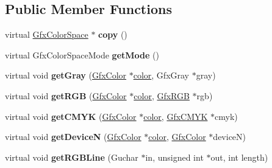 \subsection*{Public Member Functions}
\begin{DoxyCompactItemize}
\item 
\mbox{\label{class_gfx_device_c_m_y_k_color_space_ae210b4f2d41c9d1d6f9f5a31eabe4493}} 
virtual \hyperlink{class_gfx_color_space}{Gfx\+Color\+Space} $\ast$ {\bfseries copy} ()
\item 
\mbox{\label{class_gfx_device_c_m_y_k_color_space_a3071f91cbd2dd4ccefc4de88c9ab9984}} 
virtual Gfx\+Color\+Space\+Mode {\bfseries get\+Mode} ()
\item 
\mbox{\label{class_gfx_device_c_m_y_k_color_space_afa707ac339d0cae5886f3adeec4aa846}} 
virtual void {\bfseries get\+Gray} (\hyperlink{struct_gfx_color}{Gfx\+Color} $\ast$\hyperlink{structcolor}{color}, Gfx\+Gray $\ast$gray)
\item 
\mbox{\label{class_gfx_device_c_m_y_k_color_space_a789850aa9218239d82aae763448a627c}} 
virtual void {\bfseries get\+R\+GB} (\hyperlink{struct_gfx_color}{Gfx\+Color} $\ast$\hyperlink{structcolor}{color}, \hyperlink{struct_gfx_r_g_b}{Gfx\+R\+GB} $\ast$rgb)
\item 
\mbox{\label{class_gfx_device_c_m_y_k_color_space_ac4ab18ab713115b1f61e229ea0054870}} 
virtual void {\bfseries get\+C\+M\+YK} (\hyperlink{struct_gfx_color}{Gfx\+Color} $\ast$\hyperlink{structcolor}{color}, \hyperlink{struct_gfx_c_m_y_k}{Gfx\+C\+M\+YK} $\ast$cmyk)
\item 
\mbox{\label{class_gfx_device_c_m_y_k_color_space_a7152c6476985215ca5e6217e06d62909}} 
virtual void {\bfseries get\+DeviceN} (\hyperlink{struct_gfx_color}{Gfx\+Color} $\ast$\hyperlink{structcolor}{color}, \hyperlink{struct_gfx_color}{Gfx\+Color} $\ast$deviceN)
\item 
\mbox{\label{class_gfx_device_c_m_y_k_color_space_a66536bb19fd50a149aa7a67cebe1f09e}} 
virtual void {\bfseries get\+R\+G\+B\+Line} (Guchar $\ast$in, unsigned int $\ast$out, int length)

\end{DoxyCompactItemize}
